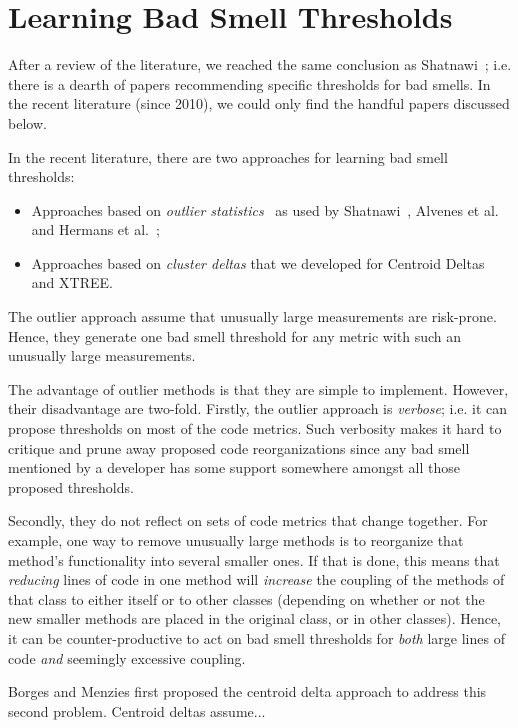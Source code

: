 \documentclass{sig-alternate}
\begin{document}
\section{Learning Bad Smell Thresholds}

After a review of the literature, we reached the same conclusion
as Shatnawi~\cite{Shatnawi10}; i.e. there is a dearth of papers recommending specific thresholds
for bad smells. In the recent literature (since 2010), we could
only find the handful   papers discussed below.

In the recent literature, there are two approaches for
learning bad smell thresholds:
\begin{itemize}
    \item Approaches based on {\em outlier statistics}~\cite{erni96,bender99}
    as used by Shatnawi~\cite{shatnawi10}, Alvenes et al.~\cite{Alves2010}
    and Hermans et al.~\cite{hermans15};
    \item  Approaches based on {\em cluster deltas} that we developed
    for   Centroid Deltas~\cite{me12c} and XTREE.
\end{itemize}
The outlier approach assume that unusually large measurements are risk-prone.
Hence, they generate one bad smell threshold for any metric
with such an unusually large measurements. 

The advantage of outlier
methods is that they are simple to implement. However,
their disadvantage are two-fold. 
Firstly, the outlier approach is {\em verbose}; i.e.  it can
propose thresholds on most of the code metrics.
Such verbosity makes it hard   to critique and prune away proposed code reorganizations since any bad smell mentioned by a developer has some support
somewhere amongst all those proposed thresholds.

Secondly, they do not reflect
on sets of code metrics that change together. For example,
one way to remove unusually large methods is to reorganize that method's
functionality into several smaller ones. If that is done,
this means that {\em reducing} lines of code in one method
will {\em increase} the coupling of the methods of that class to
either itself or to other classes (depending on whether or not
the new smaller methods are placed in the original class, or in other classes).
Hence, it can be counter-productive to act on bad smell thresholds for {\em both}
large lines of code {\em and} seemingly excessive coupling.

Borges and Menzies first proposed the centroid delta approach to address
this second problem. Centroid deltas assume...
\end{document}

